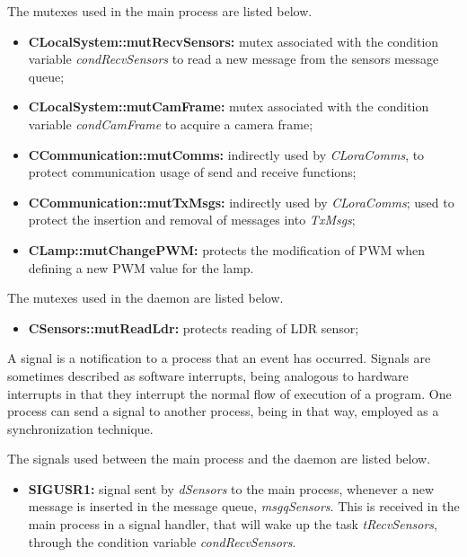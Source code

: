 \clearpage
The mutexes used in the main process are listed below.

\begin{itemize}
	\item \textbf{CLocalSystem::mutRecvSensors:} mutex associated with the condition variable \textit{condRecvSensors} to read a new message from the sensors message queue;

	\item \textbf{CLocalSystem::mutCamFrame:} mutex associated with the condition variable \textit{condCamFrame} to acquire a camera frame;

	\item \textbf{CCommunication::mutComms:} indirectly used by \textit{CLoraComms}, to protect communication usage of send and receive functions;

	\item \textbf{CCommunication::mutTxMsgs:} indirectly used by \textit{CLoraComms}; used to protect the insertion and removal of messages into \textit{TxMsgs};

	\item \textbf{CLamp::mutChangePWM:} protects the modification of PWM when defining a new PWM value for the lamp.
\end{itemize}

The mutexes used in the daemon are listed below.

\begin{itemize}
	\item \textbf{CSensors::mutReadLdr:} protects reading of LDR sensor;
\end{itemize}


A signal is a notification to a process that an event has occurred. Signals are sometimes described as software interrupts, being analogous to hardware interrupts in that they interrupt the normal flow of execution of a program. One process can send a signal to another process, being in that way, employed as a synchronization technique.

The signals used between the main process and the daemon are listed below.

\begin{itemize}
	\item \textbf{SIGUSR1:}	signal sent by \textit{dSensors} to the main process, whenever a new message is inserted in the message queue, \textit{msgqSensors}. This is received in the main process in a signal handler, that will wake up the task \textit{tRecvSensors}, through the condition variable \textit{condRecvSensors}.
\end{itemize}

